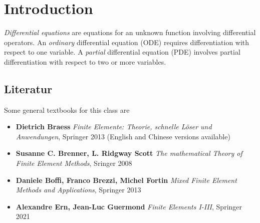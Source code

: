 \chapter{Introduction}
%
{\em Differential equations} are equations for an unknown function
involving differential operators. An {\em ordinary} differential
equation (ODE) requires differentiation with respect to one variable. A {\em
partial} differential equation (PDE) involves partial differentiation with
respect to two or more variables.

\section{Literatur}

Some general textbooks for this class are

\begin{itemize}
\item {\bf Dietrich Braess} {\it Finite Elemente: Theorie, schnelle L\"oser und Anwendungen}, Springer 2013 (English and Chinese versions available)
\item {\bf Susanne C. Brenner, L. Ridgway Scott} {\it The mathematical Theory of Finite Element Methods}, Sringer 2008
\item {\bf Daniele Boffi, Franco Brezzi, Michel Fortin} {\it Mixed Finite Element Methods and Applications}, Springer 2013
\item {\bf Alexandre Ern, Jean-Luc Guermond} {\it Finite Elements I-III}, Springer 2021
\end{itemize}



